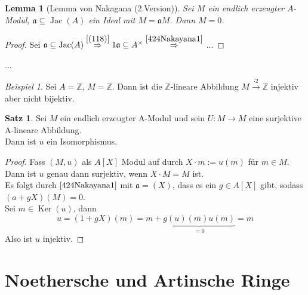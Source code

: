 \documentclass[10pt,a4paper]{article}
\newcommand{\Z}{\ensuremath{\mathbb{Z}}}
\newcommand{\Ker}{\ensuremath{\operatorname{Ker}}}
\newcommand{\Jac}{\operatorname{Jac}}
\newcounter{thm}[section]
\theoremstyle{definition}
\newtheorem{satz}[thm]{Satz}
\theoremstyle{plain}
\newtheorem{lem}[thm]{Lemma}
\theoremstyle{remark}
\newtheorem{exm}[thm]{Beispiel}
\begin{document}
\begin{lem}[Lemma von Nakagana (2.Version)]
	\label{425Nakagana2}
	Sei $M$ ein endlich erzeugter $A$-Modul, $\mathfrak a\subseteq\Jac(A)$ ein Ideal mit $M=\mathfrak aM$. Dann $M=0$.
\end{lem}
\begin{proof}
	Sei $\mathfrak a\subseteq \Jac(A)\overset{\ref{(118)}}\Rightarrow1\mathfrak a\subseteq A^\times\overset{\ref{424Nakayana1}}\Rightarrow$
		...%
\end{proof}
... %
\begin{exm}
	Sei $A=\Z$, $M=\Z$. Dann ist die $\Z$-lineare Abbildung $M\xrightarrow{\cdot 2}\Z$ injektiv aber nicht bijektiv.
\end{exm}
\begin{satz}
	\label{427}Sei $M$ ein endlich erzeugter A-Modul und sein $U:M\rightarrow M$ eine surjektive A-lineare Abbildung.\\
	Dann ist $u$ ein Isomorphismus.
\end{satz}
\begin{proof}
	Fass $(M,u)$ als $A[X]$ Modul auf durch $X\cdot m:=u(m)$ für $m\in M$.\\
	Dann ist $u$ genau dann surjektiv, wenn $X\cdot M=M$ ist.\\
	Es folgt durch $\ref{424Nakayana1}$ mit $\mathfrak a=(X)$, dass es ein $g\in A[X]$ gibt, sodass $(a+gX)(M)=0$.\\
	Sei $m\in\Ker(u)$, dann
	\[u=(1+gX)(m)=m+\underbrace{g(u)(m)u(m)}_{=0}=m\]
	Also ist $u$ injektiv.
\end{proof}
\section{Noethersche und Artinsche Ringe}
\end{document}
